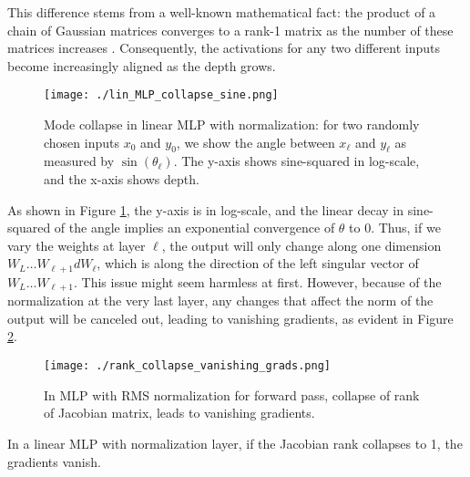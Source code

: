 \begin{remark}
This difference stems from a well-known mathematical fact: the product of a chain of Gaussian matrices converges to a rank-1 matrix as the number of these matrices increases \cite{latouche1999introduction}. Consequently, the activations for any two different inputs become increasingly aligned as the depth grows.
\end{remark}

\begin{figure}[H]
    \centering
    \texttt{[image: ./lin\_MLP\_collapse\_sine.png]}
    \caption{Mode collapse in linear MLP with normalization: for two randomly chosen inputs \( x_0 \) and \( y_0 \), we show the angle between \( x_\ell \) and \( y_\ell \) as measured by \( \sin(\theta_\ell) \). The y-axis shows sine-squared in log-scale, and the x-axis shows depth.}
    \label{fig:MLP_collapse}
\end{figure}

\begin{remark}
As shown in Figure \ref{fig:MLP_collapse}, the y-axis is in log-scale, and the linear decay in sine-squared of the angle implies an exponential convergence of \( \theta \) to 0. Thus, if we vary the weights at layer \( \ell \), the output will only change along one dimension \( W_L \dots W_{\ell+1} dW_\ell \), which is along the direction of the left singular vector of \( W_L \dots W_{\ell+1} \). This issue might seem harmless at first. However, because of the normalization at the very last layer, any changes that affect the norm of the output will be canceled out, leading to vanishing gradients, as evident in Figure \ref{fig:MLP_rank_collapse_vanishing_grads}.
\end{remark}

\begin{figure}[H]
    \centering
    \texttt{[image: ./rank\_collapse\_vanishing\_grads.png]}
    \caption{In MLP with RMS normalization for forward pass, collapse of rank of Jacobian matrix, leads to vanishing gradients.}
    \label{fig:MLP_rank_collapse_vanishing_grads}
\end{figure}

\begin{theorem}
In a linear MLP with normalization layer, if the Jacobian rank collapses to 1, the gradients vanish.
\end{theorem}

